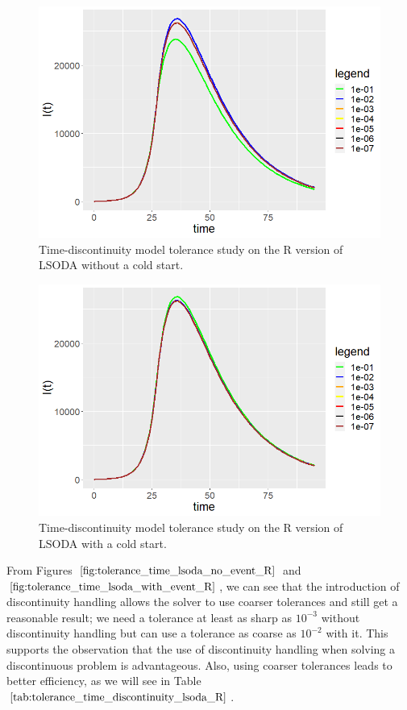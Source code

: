 \begin{figure}[H]
\centering
\includegraphics[width=0.7\linewidth]{./figures/tolerance_time_lsoda_no_event_R}
\caption{Time-discontinuity model tolerance study on the R version of LSODA without a cold start.}
\label{fig:tolerance_time_lsoda_no_event_R}
\end{figure}

\begin{figure}[H]
\centering
\includegraphics[width=0.7\linewidth]{./figures/tolerance_time_lsoda_with_event_R}
\caption{Time-discontinuity model tolerance study on the R version of LSODA with a cold start.}
\label{fig:tolerance_time_lsoda_with_event_R}
\end{figure}

From Figures $\ref{fig:tolerance_time_lsoda_no_event_R}$ and $\ref{fig:tolerance_time_lsoda_with_event_R}$, we can see that the introduction of discontinuity handling allows the solver to use coarser tolerances and still get a reasonable result; we need a tolerance at least as sharp as $10^{-3}$ without discontinuity handling but can use a tolerance as coarse as $10^{-2}$ with it. This supports the observation that the use of discontinuity handling when solving a discontinuous problem is advantageous. Also, using coarser tolerances leads to better efficiency, as we will see in Table $\ref{tab:tolerance_time_discontinuity_lsoda_R}$. 


